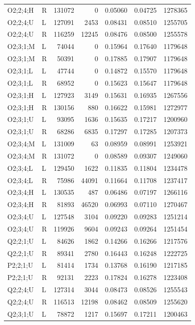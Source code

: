 {\begin{longtable}{@{}llrrrrr@{}}
O2;2;4;H & R & 131072 & 0 & 0.05060 & 0.04725 & 1278365 \\
O2;2;4;U & L & 127091 & 2453 & 0.08431 & 0.08510 & 1255705 \\
O2;2;4;U & R & 116259 & 12245 & 0.08476 & 0.08500 & 1255578 \\
O2;3;1;M & L & 74044 & 0 & 0.15964 & 0.17640 & 1179648 \\
O2;3;1;M & R & 50391 & 0 & 0.17885 & 0.17907 & 1179648 \\
O2;3;1;L & L & 47744 & 0 & 0.14872 & 0.15570 & 1179648 \\
O2;3;1;L & R & 68952 & 0 & 0.15623 & 0.15647 & 1179648 \\
O2;3;1;H & L & 127923 & 3149 & 0.15631 & 0.16935 & 1267556 \\
O2;3;1;H & R & 130156 & 880 & 0.16622 & 0.15981 & 1272977 \\
O2;3;1;U & L & 93095 & 1636 & 0.15635 & 0.17217 & 1200960 \\
O2;3;1;U & R & 68286 & 6835 & 0.17297 & 0.17285 & 1207373 \\
O2;3;4;M & L & 131009 & 63 & 0.08959 & 0.08991 & 1253921 \\
O2;3;4;M & R & 131072 & 0 & 0.08589 & 0.09307 & 1249060 \\
O2;3;4;L & L & 129450 & 1622 & 0.11835 & 0.11804 & 1234478 \\
O2;3;4;L & R & 75986 & 44091 & 0.11664 & 0.11708 & 1237417 \\
O2;3;4;H & L & 130535 & 487 & 0.06486 & 0.07197 & 1266116 \\
O2;3;4;H & R & 81893 & 46520 & 0.06993 & 0.07110 & 1270467 \\
O2;3;4;U & L & 127548 & 3104 & 0.09220 & 0.09283 & 1251214 \\
O2;3;4;U & R & 119926 & 9604 & 0.09243 & 0.09264 & 1251454 \\
Q2;2;1;U & L & 84626 & 1862 & 0.14266 & 0.16266 & 1217576 \\
Q2;2;1;U & R & 89341 & 2780 & 0.16443 & 0.16248 & 1222725 \\
P2;2;1;U & L & 81414 & 1734 & 0.13768 & 0.16190 & 1217185 \\
P2;2;1;U & R & 92131 & 2223 & 0.17824 & 0.16278 & 1223408 \\
Q2;2;4;U & L & 127314 & 3044 & 0.08473 & 0.08526 & 1255543 \\
Q2;2;4;U & R & 116513 & 12198 & 0.08462 & 0.08509 & 1255620 \\
Q2;3;1;U & L & 78872 & 1217 & 0.15697 & 0.17211 & 1200463 \\

\end{longtable}}

